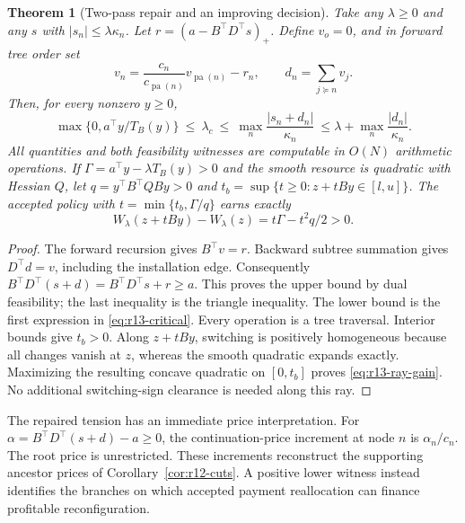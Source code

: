 \documentclass[11pt,letterpaper]{article}
\newtheorem{theorem}{Theorem}[section]
\theoremstyle{definition}
\newcommand{\1}{\mathbf 1}
\begin{document}
\begin{theorem}[Two-pass repair and an improving decision]\label{thm:r13-bracket}
Take any $\lambda\geq0$ and any $s$ with $|s_n|\leq\lambda\kappa_n$. Let $r=(a-B^\top D^\top s)_+$. Define $v_o=0$, and in forward tree order set
\[
 v_n=\frac{c_n}{c_{\operatorname{pa}(n)}}v_{\operatorname{pa}(n)}-r_n,
 \qquad d_n=\sum_{j\succeq n}v_j.
\]
Then, for every nonzero $y\geq0$,
\begin{equation}\label{eq:r13-bracket}
 \max\{0,a^\top y/T_B(y)\}\ \leq\ \lambda_c\ \leq\
 \max_n\frac{|s_n+d_n|}{\kappa_n}
 \ \leq\lambda+\max_n\frac{|d_n|}{\kappa_n}.
\end{equation}
All quantities and both feasibility witnesses are computable in $O(N)$ arithmetic operations. If $\Gamma=a^\top y-\lambda T_B(y)>0$ and the smooth resource is quadratic with Hessian $Q$, let $q=y^\top B^\top QBy>0$ and
$t_b=\sup\{t\geq0:z+tBy\in[l,u]\}$. The accepted policy with
$t=\min\{t_b,\Gamma/q\}$ earns exactly
\begin{equation}\label{eq:r13-ray-gain}
 W_\lambda(z+tBy)-W_\lambda(z)=t\Gamma-t^2q/2>0.
\end{equation}
\end{theorem}
\begin{proof}
The forward recursion gives $B^\top v=r$. Backward subtree summation gives $D^\top d=v$, including the installation edge. Consequently
$B^\top D^\top(s+d)=B^\top D^\top s+r\geq a$.
This proves the upper bound by dual feasibility; the last inequality is the triangle inequality. The lower bound is the first expression in \eqref{eq:r13-critical}. Every operation is a tree traversal. Interior bounds give $t_b>0$. Along $z+tBy$, switching is positively homogeneous because all changes vanish at $z$, whereas the smooth quadratic expands exactly. Maximizing the resulting concave quadratic on $[0,t_b]$ proves \eqref{eq:r13-ray-gain}. No additional switching-sign clearance is needed along this ray.
\end{proof}
The repaired tension has an immediate price interpretation. For $\alpha=B^\top D^\top(s+d)-a\geq0$, the continuation-price increment at node $n$ is $\alpha_n/c_n$. The root price is unrestricted. These increments reconstruct the supporting ancestor prices of Corollary~\ref{cor:r12-cuts}. A positive lower witness instead identifies the branches on which accepted payment reallocation can finance profitable reconfiguration.
\end{document}
